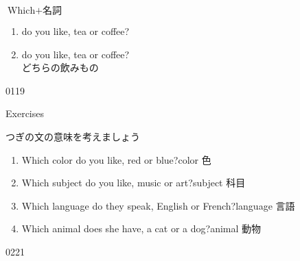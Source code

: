 \documentclass[aspectratio=169,xcolor={dvipsnames,table}]{beamer}
\begin{document}
\begin{frame}[plain]{$\text{Which} + \text{名詞}$}
\begin{enumerate}
 \item<1->  do you like, tea or coffee?
 \item<2->  do you like, tea or coffee?\\ {\small どちらの飲みもの}
\end{enumerate}

\mbox{}\hfill{\tiny 0119}\,{\scriptsize {}}

\end{frame}
\begin{frame}[plain]{Exercises}

{\small つぎの文の意味を考えましょう}
\begin{enumerate}
 \item Which color do you like, red or blue?\hfill{\scriptsize color  色}
 \item Which subject  do you like, music or art?\hfill{\scriptsize subject   科目}
 \item Which language do they speak, English or French?\hfill{\scriptsize language   言語}
 \item Which animal does she have, a cat or a dog?\hfill{\scriptsize animal   動物}
\end{enumerate} 


\mbox{}\hfill{\tiny 0221}\,{\scriptsize {}}

\end{frame}
\end{document}

